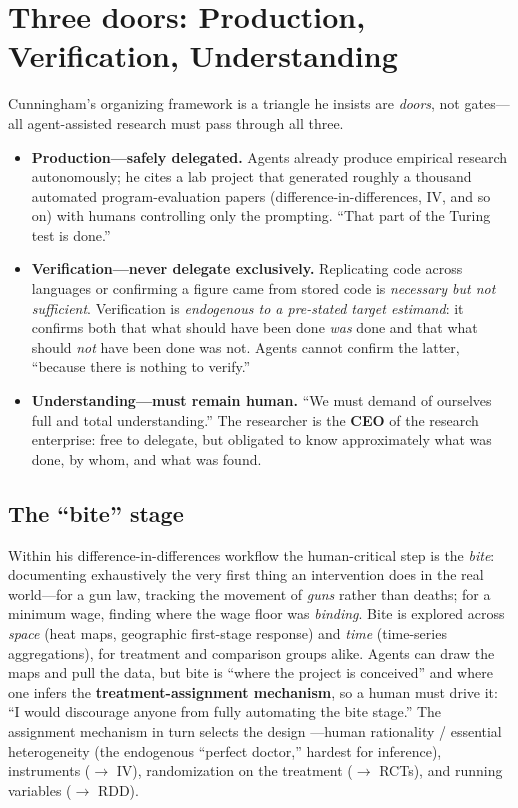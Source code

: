 \documentclass[11pt]{article}
\begin{document}
\section{Three doors: Production, Verification, Understanding}
Cunningham's organizing framework is a triangle he insists are \emph{doors},
not gates---all agent-assisted research must pass through all three.

\begin{itemize}
  \item \textbf{Production---safely delegated.} Agents already produce empirical
  research autonomously; he cites a lab project that generated roughly a thousand
  automated program-evaluation papers (difference-in-differences, IV, and so on)
  with humans controlling only the prompting. ``That part of the Turing test is
  done.''
  \item \textbf{Verification---never delegate exclusively.} Replicating code
  across languages or confirming a figure came from stored code is
  \emph{necessary but not sufficient}. Verification is \emph{endogenous to a
  pre-stated target estimand}: it confirms both that what should have been done
  \emph{was} done and that what should \emph{not} have been done was not. Agents
  cannot confirm the latter, ``because there is nothing to verify.''
  \item \textbf{Understanding---must remain human.} ``We must demand of ourselves
  full and total understanding.'' The researcher is the \textbf{CEO} of the
  research enterprise: free to delegate, but obligated to know approximately what
  was done, by whom, and what was found.
\end{itemize}

\subsection*{The ``bite'' stage}
Within his difference-in-differences workflow the human-critical step is the
\emph{bite}: documenting exhaustively the very first thing an intervention does
in the real world---for a gun law, tracking the movement of \emph{guns} rather
than deaths; for a minimum wage, finding where the wage floor was \emph{binding}.
Bite is explored across \emph{space} (heat maps, geographic first-stage response)
and \emph{time} (time-series aggregations), for treatment and comparison groups
alike. Agents can draw the maps and pull the data, but bite is ``where the
project is conceived'' and where one infers the \textbf{treatment-assignment
mechanism}, so a human must drive it: ``I would discourage anyone from fully
automating the bite stage.'' The assignment mechanism in turn selects the design
---human rationality / essential heterogeneity (the endogenous ``perfect
doctor,'' hardest for inference), instruments ($\to$ IV), randomization on the
treatment ($\to$ RCTs), and running variables ($\to$ RDD).
\end{document}
